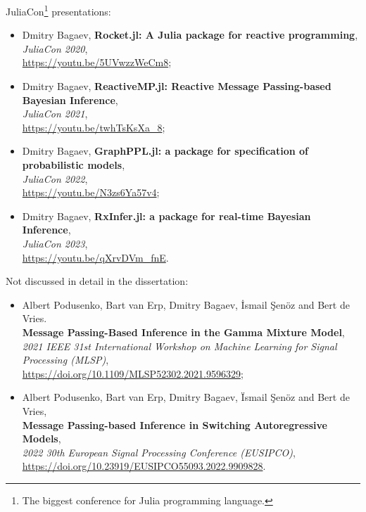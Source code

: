JuliaCon\footnote{The biggest conference for Julia programming language.} presentations:
\begin{itemize}
    \item Dmitry Bagaev,
          \textbf{Rocket.jl: A Julia package for reactive programming},\\
          \textit{JuliaCon 2020},\\
          \url{https://youtu.be/5UVwzzWeCm8};
    \item Dmitry Bagaev,
          \textbf{ReactiveMP.jl: Reactive Message Passing-based Bayesian Inference},\\
          \textit{JuliaCon 2021},\\
          \url{https://youtu.be/twhTsKsXa_8};
    \item Dmitry Bagaev,
          \textbf{GraphPPL.jl: a package for specification of probabilistic models},\\
          \textit{JuliaCon 2022},\\
          \url{https://youtu.be/N3zs6Ya57v4};
    \item Dmitry Bagaev,
          \textbf{RxInfer.jl: a package for real-time Bayesian Inference},\\
          \textit{JuliaCon 2023},\\
          \url{https://youtu.be/qXrvDVm_fnE}.
\end{itemize}

Not discussed in detail in the dissertation:
\begin{itemize}
    \item Albert Podusenko, Bart van
          Erp, Dmitry Bagaev, İsmail Şenöz and Bert de Vries.\\
          \textbf{Message Passing-Based Inference in the Gamma Mixture Model},\\
          \textit{2021 IEEE 31st International Workshop on Machine Learning for Signal
              Processing (MLSP)},\\
          \url{https://doi.org/10.1109/MLSP52302.2021.9596329};
    \item Albert Podusenko, Bart van Erp, Dmitry Bagaev, Ïsmail Şenöz and Bert de Vries,\\
          \textbf{Message Passing-based Inference in Switching Autoregressive Models},\\
          \textit{2022 30th European Signal Processing Conference (EUSIPCO)},\\
          \url{https://doi.org/10.23919/EUSIPCO55093.2022.9909828}.
\end{itemize}
